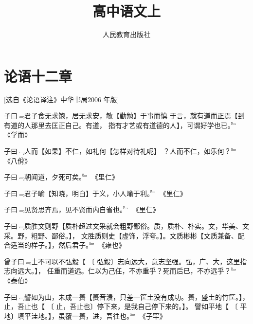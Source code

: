 \documentclass{zhvt-classic}
\title{高中语文上}[高~中~语~文~上]
\author{人民教育出版社}
\begin{document}
\maketitle

\clearpage

\gridall
\tableofcontents

\chapter*[]{论语十二章}[选自《论语译注》中华书局2006 年版]

子曰﹃君子食无求饱，居无求安，敏【勤勉】于事而慎
于言，就有道而正焉【到有道的人那里去匡正自己。有道，
指有才艺或有道德的人】，可谓好学也已。﹄ \hspace{1cm} 《学而》

子曰﹃人而【如果】不仁，如礼何【怎样对待礼呢】 ？人而不仁，如乐何？﹄ \hspace{1cm} 《八佾》


子曰﹃朝闻道，夕死可矣。﹄ \hspace{1cm} 《里仁》

子曰﹃君子喻【知晓，明白】于义，小人喻于利。﹄ \hspace{1cm} 《里仁》

子曰﹃见贤思齐焉，见不贤而内自省也。﹄ \hspace{1cm} 《里仁》

子曰﹃质胜文则野【质朴超过文采就会粗野鄙俗。质，质朴、朴实。文，华美、文采。野，粗野、鄙俗。】，
文胜质则史【虚饰，浮夸。】。文质彬彬【文质兼备、配合适当的样子。】，然后君子。﹄ \hspace{1cm} 《雍也》

曾子曰﹃士不可以不弘毅【 \hspace{0.5cm}〔 弘毅〕\hspace{0.5cm}志向远大，意志坚强。弘，广、大，这里指志向远大。】，
任重而道远。仁以为己任，不亦重乎？死而后已，不亦远乎？﹄ \hspace{1cm} 《泰伯》

子曰﹃譬如为山，未成一篑【篑音溃，只差一筐土没有成功。篑，盛土的竹筐。】，
止，吾止也【 \hspace{0.5cm}〔 止，吾止也〕\hspace{0.5cm}停下来，是我自己停下来的。】。
譬如平地【 \hspace{0.5cm}〔 平地〕\hspace{0.5cm}填平洼地。】，虽覆一篑，进，吾往也。﹄ \hspace{1cm} 《子罕》
\end{document}
